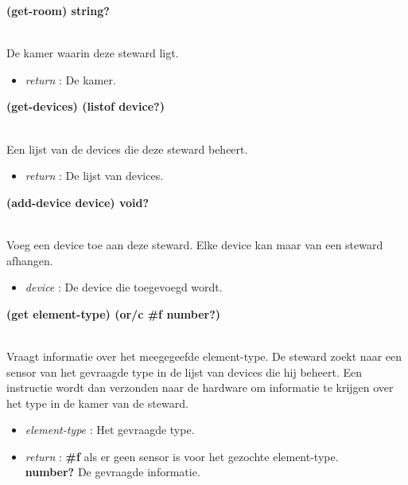 \documentclass{article}
\newcommand{\ar}{\ding{213} }
\newcommand{\code}[1]{\textcolor{code}{#1}}
\newcommand{\lb}[1][]{\code{(#1}}
\newcommand{\rb}{\code{)}}
\newcommand{\racket}[1]{
	{\color{blue}\textbf{#1}}
}
\begin{document}
\begin{framed}
\hypertarget{steward:get-room}{\racket{\lb[get-room]\rb \ar \code{string?}}}
\\De kamer waarin deze steward ligt.
\begin{itemize}
	\item \emph{return} : De kamer.
\end{itemize}
\end{framed}

\begin{framed}
\hypertarget{steward:get-devices}{\racket{\lb[get-devices]\rb \ar \lb[listof] device?\rb}}
\\Een lijst van de devices die deze steward beheert.
\begin{itemize}
	\item \emph{return} : De lijst van devices.
\end{itemize}
\end{framed}

\begin{framed}
\hypertarget{steward:add-device}{\racket{\lb[add-device] device\rb \ar \code{void?}}}
\\Voeg een device toe aan deze steward. Elke device kan maar van een steward afhangen.
\begin{itemize}
	\item \emph{device} : De device die toegevoegd wordt.
\end{itemize}
\end{framed}

\begin{framed}
\hypertarget{steward:get}{\racket{\lb[get] element-type\rb \ar \lb[or/c] \#f number?\rb}}
\\Vraagt informatie over het meegegeefde element-type. De steward zoekt naar een sensor van het gevraagde type in de lijst van devices die hij beheert. Een instructie wordt dan verzonden naar de hardware om informatie te krijgen over het type in de kamer van de steward.
\begin{itemize}
	\item \emph{element-type} : Het gevraagde type.
	\item \emph{return} : \racket{\#f} als er geen sensor is voor het gezochte element-type.\\\racket{number?} De gevraagde informatie.
\end{itemize}
\end{framed}
\end{document}
